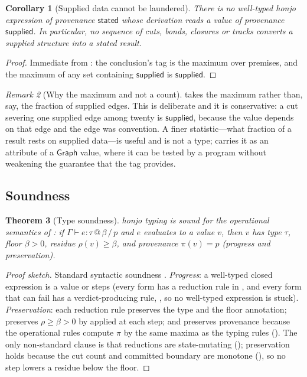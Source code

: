 \documentclass[11pt,twocolumn,a4paper]{article}
\theoremstyle{thmstyle}
\newtheorem{theorem}{Theorem}[section]
\newtheorem{corollary}[theorem]{Corollary}
\theoremstyle{definition}
\theoremstyle{remark}
\newtheorem{remark}[theorem]{Remark}
\newcommand{\flo}{\beta}
\newcommand{\res}{\rho}
\newcommand{\stated}{\textsf{stated}}
\newcommand{\supplied}{\textsf{supplied}}
\newcommand{\Prov}{\pi}
\begin{document}
\begin{corollary}[Supplied data cannot be laundered]
\label{cor:no-launder}
There is no well-typed honjo expression of provenance $\stated$ whose
derivation reads a value of provenance $\supplied$. In particular, no
sequence of cuts, bonds, closures or tracks converts a supplied structure
into a stated result.
\end{corollary}

\begin{proof}
Immediate from : the conclusion's tag is the
maximum over premises, and the maximum of any set containing $\supplied$
is $\supplied$.
\end{proof}

\begin{remark}[Why the maximum and not a count]
\label{rem:max-not-count}
 takes the maximum rather than, say, the fraction of
supplied edges. This is deliberate and it is conservative: a cut severing
one supplied edge among twenty is $\supplied$, because the value depends
on that edge and the edge was convention. A finer statistic---what
fraction of a result rests on supplied data---is useful and is not a
type;  carries it as an attribute of a
$\mathsf{Graph}$ value, where it can be tested by a program without
weakening the guarantee that the tag provides.
\end{remark}

\subsection{Soundness}

\begin{theorem}[Type soundness]
\label{thm:soundness}
honjo typing is sound for the operational semantics of :
if $\Gamma\vdash e:\tau\,@\,\flo\,/\,p$ and $e$ evaluates to a value $v$,
then $v$ has type $\tau$, floor $\flo>0$, residue $\res(v)\ge\flo$, and
provenance $\Prov(v)=p$ (progress and preservation).
\end{theorem}

\begin{proof}[Proof sketch]
Standard syntactic soundness \citep{pierce2002,milner1978}.
\emph{Progress}: a well-typed closed expression is a value or steps
(every form has a reduction rule in , and every form that
can fail has a verdict-producing rule, , so no
well-typed expression is stuck). \emph{Preservation}: each reduction rule
preserves the type and the floor annotation; preserves $\res\ge\flo>0$ by
 applied at each step; and preserves provenance
because the operational rules compute $\Prov$ by the same maxima as the
typing rules (). The only non-standard clause is
that reductions are state-mutating (); preservation
holds because the cut count and committed boundary are monotone
(), so no step lowers a residue below the floor.
\end{proof}
\end{document}
